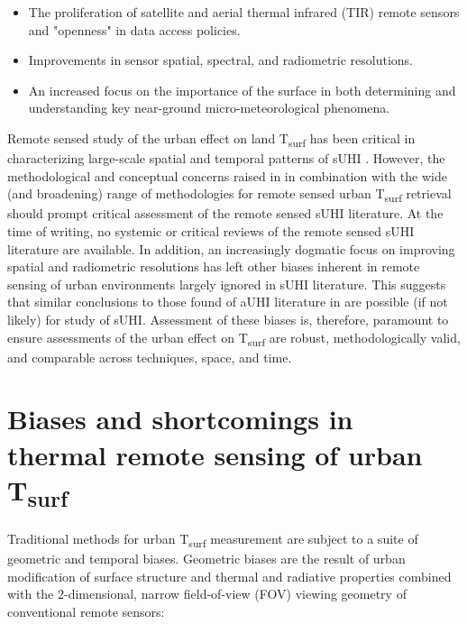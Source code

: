 \begin{bibunit}
\begin{itemize}
	\item The proliferation of satellite and aerial thermal infrared (TIR) remote sensors and "openness" in data access policies.
	\item Improvements in sensor spatial, spectral, and radiometric resolutions. 
	\item An increased focus on the importance of the surface in both determining and understanding key near-ground micro-meteorological phenomena.
\end{itemize}

Remote sensed study of the urban effect on land T\textsubscript{surf} has been critical in characterizing large-scale spatial and temporal patterns of sUHI \citep{Peng2012, Streutker2003, Imhoff2010}. However, the methodological and conceptual concerns raised in \citet{Stewart2011} in combination with the wide (and broadening) range of methodologies for remote sensed urban T\textsubscript{surf} retrieval should prompt critical assessment of the remote sensed sUHI literature. At the time of writing, no systemic or critical reviews of the remote sensed sUHI literature are available. In addition, an increasingly dogmatic focus on improving spatial and radiometric resolutions has left other biases inherent in remote sensing of urban environments largely ignored in sUHI literature. This suggests that similar conclusions to those found of aUHI literature in \citet{Stewart2011} are possible (if not likely) for study of sUHI. Assessment of these biases is, therefore, paramount to ensure assessments of the urban effect on T\textsubscript{surf} are robust, methodologically valid, and comparable across techniques, space, and time.

\section{Biases and shortcomings in thermal remote sensing of urban T\textsubscript{surf}}

Traditional methods for urban T\textsubscript{surf} measurement are subject to a suite of geometric and temporal biases. Geometric biases are the result of urban modification of surface structure and thermal and radiative properties combined with the 2-dimensional, narrow field-of-view (FOV) viewing geometry of conventional remote sensors:



\end{bibunit}

